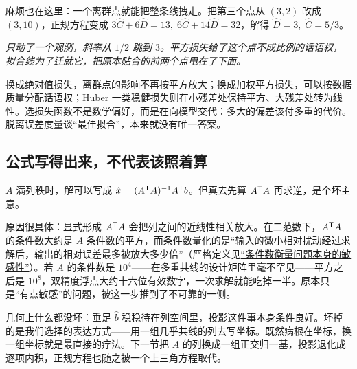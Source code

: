 麻烦也在这里：一个离群点就能把整条线拽走。把第三个点从 \((3,2)\) 改成 \((3,10)\)，正规方程变成 \(3\hat C+6\hat D=13,\;6\hat C+14\hat D=32\)，解得 \(\hat D=3,\;\hat C=5/3\)。

\begin{center}

\emph{只动了一个观测，斜率从 \(1/2\) 跳到 \(3\)。平方损失给了这个点不成比例的话语权，拟合线为了迁就它，把原本贴合的前两个点甩在了下面。}
\end{center}

换成绝对值损失，离群点的影响不再按平方放大；换成加权平方损失，可以按数据质量分配话语权；Huber 一类稳健损失则在小残差处保持平方、大残差处转为线性。选损失函数不是数学偏好，而是在向模型交代：多大的偏差该付多重的代价。脱离误差度量谈``最佳拟合''，本来就没有唯一答案。

\subsection{公式写得出来，不代表该照着算}

\(A\) 满列秩时，解可以写成 \(\hat x=(A^{\mathsf{T}}A)^{-1}A^{\mathsf{T}}b\)。但真去先算 \(A^{\mathsf{T}}A\) 再求逆，是个坏主意。

原因很具体：显式形成 \(A^{\mathsf{T}}A\) 会把列之间的近线性相关放大。在二范数下，\(A^{\mathsf{T}}A\) 的条件数大约是 \(A\) 条件数的平方，而条件数量化的是``输入的微小相对扰动经过求解后，输出的相对误差最多被放大多少倍''（严格定义见\hyperref[sec:08-Numerical-Analysis/01-Floating-Point-and-Error/03]{``条件数衡量问题本身的敏感性''}）。若 \(A\) 的条件数是 \(10^4\)——在多重共线的设计矩阵里毫不罕见——平方之后是 \(10^8\)，双精度浮点大约十六位有效数字，一次求解就能吃掉一半。原本只是``有点敏感''的问题，被这一步推到了不可靠的一侧。

几何上什么都没坏：垂足 \(\hat b\) 稳稳待在列空间里，投影这件事本身条件良好。坏掉的是我们选择的表达方式——用一组几乎共线的列去写坐标。既然病根在坐标，换一组坐标就是最直接的疗法。下一节把 \(A\) 的列换成一组正交归一基，投影退化成逐项内积，正规方程也随之被一个上三角方程取代。
